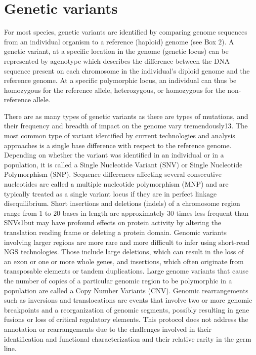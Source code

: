 \section{Genetic variants}

For most species, genetic variants are identified by comparing genome sequences from an individual organism to a reference (haploid) genome (see Box 2). A genetic variant, at a specific location in the genome (genetic locus) can be represented by agenotype which describes the difference between the DNA sequence present on each chromosome in the individual’s diploid genome and the reference genome. At a specific polymorphic locus, an individual can thus be homozygous for the reference allele, heterozygous, or homozygous for the non-reference allele.

There are as many types of genetic variants as there are types of mutations, and their frequency and breadth of impact on the genome vary tremendously13. The most common type of variant identified by current technologies and analysis approaches is a single base difference with respect to the reference genome. Depending on whether the variant was identified in an individual or in a population, it is called a Single Nucleotide Variant (SNV) or Single Nucleotide Polymorphism (SNP). Sequence differences affecting several consecutive nucleotides are called a multiple nucleotide polymorphism (MNP) and are typically treated as a single variant locus if they are in perfect linkage disequilibrium. Short insertions and deletions (indels) of a chromosome region range from 1 to 20 bases in length are approximately 30 times less frequent than SNVs1but may have profound effects on protein activity by altering the translation reading frame or deleting a protein domain. Genomic variants involving larger regions are more rare and more difficult to infer using short-read NGS technologies. Those include large deletions, which can result in the loss of an exon or one or more whole genes, and insertions, which often originate from transposable elements or tandem duplications. Large genome variants that cause the number of copies of a particular genomic region to be polymorphic in a population are called a Copy Number Variants (CNV). Genomic rearrangements such as inversions and translocations are events that involve two or more genomic breakpoints and a reorganization of genomic segments, possibly resulting in gene fusions or loss of critical regulatory elements. This protocol does not address the annotation or rearrangements due to the challenges involved in their identification and functional characterization and their relative rarity in the germ line.

